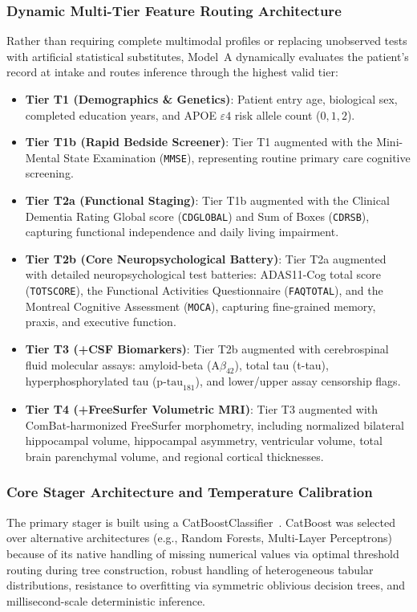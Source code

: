 \subsubsection{Dynamic Multi-Tier Feature Routing Architecture}
Rather than requiring complete multimodal profiles or replacing unobserved tests with artificial statistical substitutes, Model~A dynamically evaluates the patient's record at intake and routes inference through the highest valid tier:
\begin{itemize}
    \item \textbf{Tier T1 (Demographics \& Genetics)}: Patient entry age, biological sex, completed education years, and APOE $\varepsilon4$ risk allele count ($0, 1, 2$).
    \item \textbf{Tier T1b (Rapid Bedside Screener)}: Tier T1 augmented with the Mini-Mental State Examination (\texttt{MMSE}), representing routine primary care cognitive screening.
    \item \textbf{Tier T2a (Functional Staging)}: Tier T1b augmented with the Clinical Dementia Rating Global score (\texttt{CDGLOBAL}) and Sum of Boxes (\texttt{CDRSB}), capturing functional independence and daily living impairment.
    \item \textbf{Tier T2b (Core Neuropsychological Battery)}: Tier T2a augmented with detailed neuropsychological test batteries: ADAS11-Cog total score (\texttt{TOTSCORE}), the Functional Activities Questionnaire (\texttt{FAQTOTAL}), and the Montreal Cognitive Assessment (\texttt{MOCA}), capturing fine-grained memory, praxis, and executive function.
    \item \textbf{Tier T3 (+CSF Biomarkers)}: Tier T2b augmented with cerebrospinal fluid molecular assays: amyloid-beta ($\text{A}\beta_{42}$), total tau (t-tau), hyperphosphorylated tau ($\text{p-tau}_{181}$), and lower/upper assay censorship flags.
    \item \textbf{Tier T4 (+FreeSurfer Volumetric MRI)}: Tier T3 augmented with ComBat-harmonized FreeSurfer morphometry, including normalized bilateral hippocampal volume, hippocampal asymmetry, ventricular volume, total brain parenchymal volume, and regional cortical thicknesses.
\end{itemize}

\subsubsection{Core Stager Architecture and Temperature Calibration}
The primary stager is built using a CatBoostClassifier~\cite{prokhorenkova2018catboost}. CatBoost was selected over alternative architectures (e.g., Random Forests, Multi-Layer Perceptrons) because of its native handling of missing numerical values via optimal threshold routing during tree construction, robust handling of heterogeneous tabular distributions, resistance to overfitting via symmetric oblivious decision trees, and millisecond-scale deterministic inference. 

